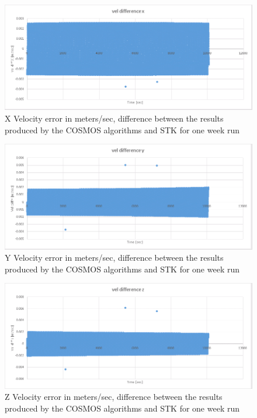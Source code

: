 \documentclass[12pt,letterpaper]{paper}
\begin{document}
\begin{figure}
\centering
\includegraphics[width=0.9\linewidth]{figures/compare_cosmos_stk_tle2gcrf_vel_error_x}
\caption{X Velocity error in meters/sec, difference between the results produced by the COSMOS algorithms and STK for one week run}
\label{fig:compare_cosmos_stk_tle2gcrf_vel_error_x}
\end{figure}

\begin{figure}
\centering
\includegraphics[width=0.9\linewidth]{figures/compare_cosmos_stk_tle2gcrf_vel_error_y}
\caption{Y Velocity error in meters/sec, difference between the results produced by the COSMOS algorithms and STK for one week run}
\label{fig:compare_cosmos_stk_tle2gcrf_vel_error_y}
\end{figure}


\begin{figure}
\centering
\includegraphics[width=0.9\linewidth]{figures/compare_cosmos_stk_tle2gcrf_vel_error_z}
\caption{Z Velocity error in meters/sec, difference between the results produced by the COSMOS algorithms and STK for one week run}
\label{fig:compare_cosmos_stk_tle2gcrf_vel_error_z}
\end{figure}
\end{document}
